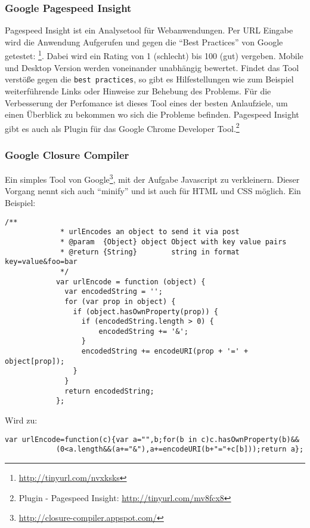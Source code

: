 		\subsubsection{Google Pagespeed Insight} %
		\label{ssub:google_pagespeed_insight}
			Pagespeed Insight ist ein Analysetool für Webanwendungen. Per URL Eingabe wird die Anwendung Aufgerufen und gegen die "`Best Practices"' von Google getestet: \footnote{ \url{http://tinyurl.com/nvxksks} }. Dabei wird ein Rating von 1 (schlecht) bis 100 (gut) vergeben. Mobile und Desktop Version werden voneinander unabhängig bewertet. Findet das Tool verstöße gegen die \texttt{best practices}, so gibt es Hilfestellungen wie zum Beispiel weiterführende Links oder Hinweise zur Behebung des Problems. Für die Verbesserung der Perfomance ist dieses Tool eines der besten Anlaufziele, um einen Überblick zu bekommen wo sich die Probleme befinden. Pagespeed Insight gibt es auch als Plugin für das Google Chrome Developer Tool.\footnote{Plugin - Pagespeed Insight: \url{http://tinyurl.com/mv8fcx8}}
		

		\subsubsection{Google Closure Compiler} %
		\label{ssub:closure_compiler}
			Ein simples Tool von Google\footnote{\url{http://closure-compiler.appspot.com/}}, mit der Aufgabe Javascript zu verkleinern. Dieser Vorgang nennt sich auch "`minify"' und ist auch für HTML und CSS möglich. Ein Beispiel:

			\begin{lstlisting}[captionpos=t, caption=Input, label=lst:minifyInput]
			/**
			 * urlEncodes an object to send it via post
			 * @param  {Object} object Object with key value pairs
			 * @return {String}        string in format key=value&foo=bar
			 */
			var urlEncode = function (object) {
			  var encodedString = '';
			  for (var prop in object) {
			    if (object.hasOwnProperty(prop)) {
			      if (encodedString.length > 0) {
			          encodedString += '&';
			      }
			      encodedString += encodeURI(prop + '=' + object[prop]);
			    }
			  }
			  return encodedString;
			};
			\end{lstlisting}

			Wird zu:

			\begin{lstlisting}[captionpos=t, caption=Output, label=lst:minifyOutput, breaklines=false]
			var urlEncode=function(c){var a="",b;for(b in c)c.hasOwnProperty(b)&&
			(0<a.length&&(a+="&"),a+=encodeURI(b+"="+c[b]));return a};
			\end{lstlisting}

